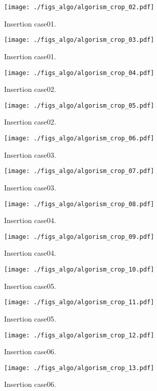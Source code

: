 \begin{figure}[h]
  \texttt{[image: ./figs\_algo/algorism\_crop\_02.pdf]}
  \caption{
    Insertion case01.
  }
\end{figure}
\begin{figure}[h]
  \texttt{[image: ./figs\_algo/algorism\_crop\_03.pdf]}
  \caption{
    Insertion case01.
  }
  \label{fig_IpCHashT_insert_hard_case08}
\end{figure}

\begin{figure}[h]
  \texttt{[image: ./figs\_algo/algorism\_crop\_04.pdf]}
  \caption{
    Insertion case02.
  }
\end{figure}
\begin{figure}[h]
  \texttt{[image: ./figs\_algo/algorism\_crop\_05.pdf]}
  \caption{
    Insertion case02.
  }
  \label{fig_IpCHashT_insert_hard_case08}
\end{figure}

\begin{figure}[h]
  \texttt{[image: ./figs\_algo/algorism\_crop\_06.pdf]}
  \caption{
    Insertion case03.
  }
\end{figure}
\begin{figure}[h]
  \texttt{[image: ./figs\_algo/algorism\_crop\_07.pdf]}
  \caption{
    Insertion case03.
  }
  \label{fig_IpCHashT_insert_hard_case08}
\end{figure}

\begin{figure}[h]
  \texttt{[image: ./figs\_algo/algorism\_crop\_08.pdf]}
  \caption{
    Insertion case04.
  }
\end{figure}
\begin{figure}[h]
  \texttt{[image: ./figs\_algo/algorism\_crop\_09.pdf]}
  \caption{
    Insertion case04.
  }
  \label{fig_IpCHashT_insert_hard_case08}
\end{figure}

\begin{figure}[h]
  \texttt{[image: ./figs\_algo/algorism\_crop\_10.pdf]}
  \caption{
    Insertion case05.
  }
\end{figure}
\begin{figure}[h]
  \texttt{[image: ./figs\_algo/algorism\_crop\_11.pdf]}
  \caption{
    Insertion case05.
  }
  \label{fig_IpCHashT_insert_hard_case08}
\end{figure}

\begin{figure}[h]
  \texttt{[image: ./figs\_algo/algorism\_crop\_12.pdf]}
  \caption{
    Insertion case06.
  }
\end{figure}
\begin{figure}[h]
  \texttt{[image: ./figs\_algo/algorism\_crop\_13.pdf]}
  \caption{
    Insertion case06.
  }
  \label{fig_IpCHashT_insert_hard_case08}
\end{figure}

